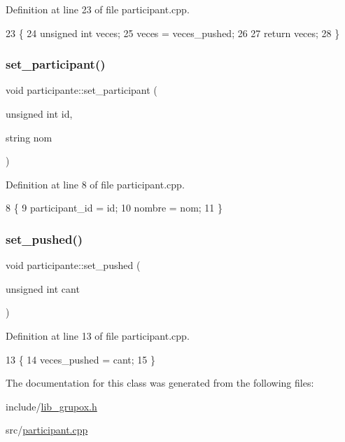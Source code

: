 Definition at line 23 of file participant.\+cpp.


\begin{DoxyCode}
23                                            \{
24     \textcolor{keywordtype}{unsigned} \textcolor{keywordtype}{int} veces;
25     veces = veces\_pushed;
26 
27     \textcolor{keywordflow}{return} veces;
28 \}
\end{DoxyCode}
\mbox{\label{classparticipante_ab315d25505963e66486cc24b1eafef32}} 
\subsubsection{\texorpdfstring{set\+\_\+participant()}{set\_participant()}}
{\footnotesize\ttfamily void participante\+::set\+\_\+participant (\begin{DoxyParamCaption}\item[{unsigned int}]{id,  }\item[{string}]{nom }\end{DoxyParamCaption})}



Definition at line 8 of file participant.\+cpp.


\begin{DoxyCode}
8                                                              \{
9         participant\_id = id;
10         nombre = nom;
11 \}
\end{DoxyCode}
\mbox{\label{classparticipante_a993d194c0c2f2d2e2ce13a23f8ca2a35}} 
\subsubsection{\texorpdfstring{set\+\_\+pushed()}{set\_pushed()}}
{\footnotesize\ttfamily void participante\+::set\+\_\+pushed (\begin{DoxyParamCaption}\item[{unsigned int}]{cant }\end{DoxyParamCaption})}



Definition at line 13 of file participant.\+cpp.


\begin{DoxyCode}
13                                               \{
14         veces\_pushed = cant;
15 \}
\end{DoxyCode}


The documentation for this class was generated from the following files\+:\begin{DoxyCompactItemize}
\item 
include/\hyperlink{lib__grupox_8h}{lib\+\_\+grupox.\+h}\item 
src/\hyperlink{participant_8cpp}{participant.\+cpp}\end{DoxyCompactItemize}
